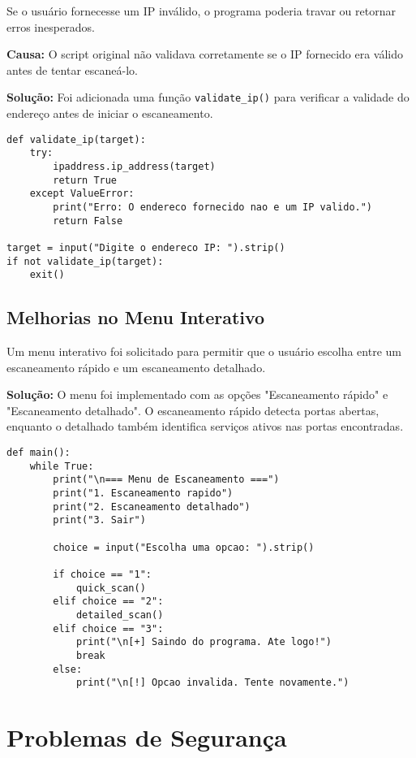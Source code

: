\documentclass[12pt]{article}
\begin{document}
Se o usuário fornecesse um IP inválido, o programa poderia travar ou retornar erros inesperados.

\textbf{Causa:} O script original não validava corretamente se o IP fornecido era válido antes de tentar escaneá-lo.

\textbf{Solução:} Foi adicionada uma função \texttt{validate\_ip()} para verificar a validade do endereço antes de iniciar o escaneamento.

\begin{lstlisting}
def validate_ip(target):
    try:
        ipaddress.ip_address(target)
        return True
    except ValueError:
        print("Erro: O endereco fornecido nao e um IP valido.")
        return False

target = input("Digite o endereco IP: ").strip()
if not validate_ip(target):
    exit()
\end{lstlisting}

\subsection{Melhorias no Menu Interativo}

Um menu interativo foi solicitado para permitir que o usuário escolha entre um escaneamento rápido e um escaneamento detalhado.

\textbf{Solução:} O menu foi implementado com as opções "Escaneamento rápido" e "Escaneamento detalhado". O escaneamento rápido detecta portas abertas, enquanto o detalhado também identifica serviços ativos nas portas encontradas.

\begin{lstlisting}
def main():
    while True:
        print("\n=== Menu de Escaneamento ===")
        print("1. Escaneamento rapido")
        print("2. Escaneamento detalhado")
        print("3. Sair")

        choice = input("Escolha uma opcao: ").strip()
      
        if choice == "1":
            quick_scan()
        elif choice == "2":
            detailed_scan()
        elif choice == "3":
            print("\n[+] Saindo do programa. Ate logo!")
            break
        else:
            print("\n[!] Opcao invalida. Tente novamente.")
\end{lstlisting}

\section{Problemas de Segurança}
\end{document}
